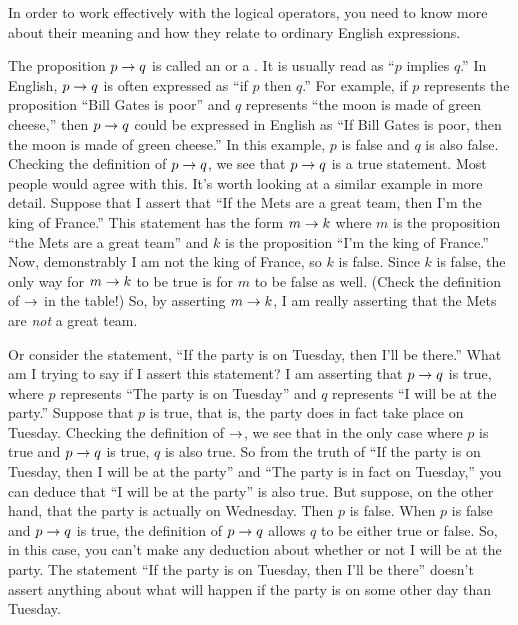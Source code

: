 In order to work effectively with the logical operators, you need
to know more about their meaning and how they relate to ordinary 
English expressions.

\medbreak

The proposition $p\rightarrow q$ is called
an  or a .  It is usually
read as ``$p$ implies $q$.''
In English, $p\rightarrow q$ is often expressed as ``if $p$ then $q$.''
For example, if $p$ represents the proposition ``Bill Gates is poor''
and $q$ represents ``the moon is made of green cheese,'' then $p\rightarrow q$
could be expressed in English as ``If Bill Gates is poor,
then the moon is made of green cheese.''  In this example, $p$ is
false and $q$ is also false.  Checking the definition of $p\rightarrow q$,
we see that $p\rightarrow q$ is a true statement.  Most people would agree
with this.  It's worth looking at a similar example in more detail.
Suppose that I assert that ``If the Mets are a great team, then
I'm the king of France.''  This statement has the form $m\rightarrow k$
where $m$ is the proposition ``the Mets are a great team'' and $k$
is the proposition ``I'm the king of France.''  Now, demonstrably
I am not the king of France, so $k$ is false.  Since $k$ is false,
the only way for $m\rightarrow k$ to be true is for $m$ to be false as well.
(Check the definition of $\rightarrow$ in the table!)
So, by asserting $m\rightarrow k$, I am really asserting that the Mets are
\emph{not} a great team.

Or consider the statement, ``If the party is on Tuesday, then I'll
be there.''  What am I trying to say if I assert this statement?
I am asserting that $p\rightarrow q$ is true, where $p$ represents ``The party
is on Tuesday'' and $q$ represents ``I will be at the party.''
Suppose that $p$ is true, that is, the party does in fact take place
on Tuesday.  Checking the definition of $\rightarrow$, we see that in the
only case where $p$ is true and $p\rightarrow q$ is true, $q$ is also true.
So from the truth of ``If the party is on Tuesday, then I will be at the party''
and ``The party is in fact on Tuesday,'' you can deduce that
``I will be at the party'' is also true.  But suppose, on the other
hand, that the party is actually on Wednesday.  Then $p$ is false.
When $p$ is false and $p\rightarrow q$ is true, the definition of $p\rightarrow q$ 
allows $q$ to be either true or false.  So, in this case, you can't
make any deduction about whether or not I will be at the party.
The statement ``If the party is on Tuesday, then I'll be there''
doesn't assert anything about what will happen if the party is on
some other day than Tuesday.

